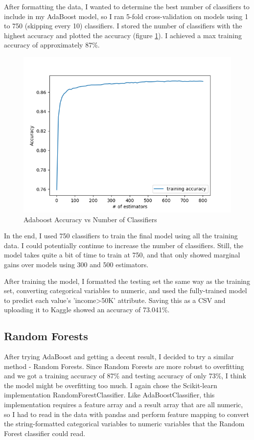 \documentclass{article}
\begin{document}
After formatting the data, I wanted to determine the best number of classifiers to include in my AdaBoost model, so I ran 5-fold cross-validation on models using 1 to 750 (skipping every 10) classifiers. I stored the number of classifiers with the highest accuracy and plotted the accuracy (figure \ref{fig:adaboost}). I achieved a max training accuracy of approximately 87\%.

\begin{figure}[h]
    \centering
    \includegraphics[width=0.4\linewidth]{img/ab_acc.png}
    \caption{Adaboost Accuracy vs Number of Classifiers}
    \label{fig:adaboost}
\end{figure}

In the end, I used 750 classifiers to train the final model using all the training data. I could potentially continue to increase the number of classifiers. Still, the model takes quite a bit of time to train at 750, and that only showed marginal gains over models using 300 and 500 estimators.

After training the model, I formatted the testing set the same way as the training set, converting categorical variables to numeric, and used the fully-trained model to predict each value's 'income>50K' attribute. Saving this as a CSV and uploading it to Kaggle showed an accuracy of 73.041\%. 

\subsection{Random Forests}

After trying AdaBoost and getting a decent result, I decided to try a similar method - Random Forests. Since Random Forests are more robust to overfitting and we got a training accuracy of 87\% and testing accuracy of only 73\%, I think the model might be overfitting too much. I again chose the Scikit-learn implementation RandomForestClassifier. Like AdaBoostClassifier, this implementation requires a feature array and a result array that are all numeric, so I had to read in the data with pandas and perform feature mapping to convert the string-formatted categorical variables to numeric variables that the Random Forest classifier could read. 
\end{document}
